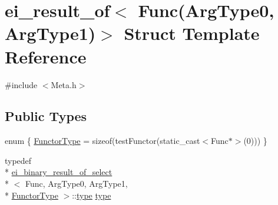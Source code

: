 \hypertarget{structei__result__of_3_01_func_07_arg_type0_00_01_arg_type1_08_4}{\section{ei\-\_\-result\-\_\-of$<$ Func(Arg\-Type0, Arg\-Type1)$>$ Struct Template Reference}
\label{structei__result__of_3_01_func_07_arg_type0_00_01_arg_type1_08_4}
}


{\ttfamily \#include $<$Meta.\-h$>$}

\subsection*{Public Types}
\begin{DoxyCompactItemize}
\item 
enum \{ \hyperlink{structei__result__of_3_01_func_07_arg_type0_00_01_arg_type1_08_4_a97e925166457ea3f718723914f014052a26b141000332d6c74e48e0462465b26f}{Functor\-Type} = sizeof(test\-Functor(static\-\_\-cast$<$Func$\ast$$>$(0)))
 \}
\item 
typedef \\*
\hyperlink{structei__binary__result__of__select}{ei\-\_\-binary\-\_\-result\-\_\-of\-\_\-select}\\*
$<$ Func, Arg\-Type0, Arg\-Type1, \\*
\hyperlink{structei__result__of_3_01_func_07_arg_type0_00_01_arg_type1_08_4_a97e925166457ea3f718723914f014052a26b141000332d6c74e48e0462465b26f}{Functor\-Type} $>$\-::\hyperlink{structei__result__of_3_01_func_07_arg_type0_00_01_arg_type1_08_4_a6232bd65458d646fec6f99ae535593c4}{type} \hyperlink{structei__result__of_3_01_func_07_arg_type0_00_01_arg_type1_08_4_a6232bd65458d646fec6f99ae535593c4}{type}
\end{DoxyCompactItemize}
